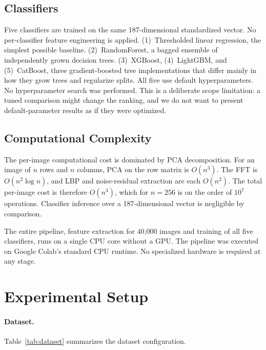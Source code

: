 \documentclass[runningheads]{llncs}
\begin{document}
\subsection{Classifiers}

Five classifiers are trained on the same 187-dimensional standardized vector. No per-classifier feature engineering is applied. (1)~Thresholded linear regression, the simplest possible baseline. (2)~RandomForest, a bagged ensemble of independently grown decision trees. (3)~XGBoost, (4)~LightGBM, and (5)~CatBoost, three gradient-boosted tree implementations that differ mainly in how they grow trees and regularize splits. All five use default hyperparameters. No hyperparameter search was performed. This is a deliberate scope limitation: a tuned comparison might change the ranking, and we do not want to present default-parameter results as if they were optimized.


\subsection{Computational Complexity}

The per-image computational cost is dominated by PCA decomposition. For an image of $n$ rows and $n$ columns, PCA on the row matrix is $O(n^3)$. The FFT is $O(n^2 \log n)$, and LBP and noise-residual extraction are each $O(n^2)$. The total per-image cost is therefore $O(n^3)$, which for $n = 256$ is on the order of $10^7$ operations. Classifier inference over a 187-dimensional vector is negligible by comparison.

The entire pipeline, feature extraction for 40,000 images and training of all five classifiers, runs on a single CPU core without a GPU. The pipeline was executed on Google Colab's standard CPU runtime. No specialized hardware is required at any stage.


\section{Experimental Setup}

\paragraph{Dataset.} Table~\ref{tab:dataset} summarizes the dataset configuration.
\end{document}
